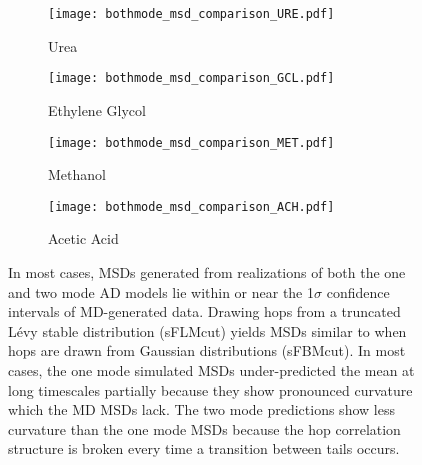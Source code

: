 \documentclass[journal=ancac3,manuscript=article,layout=twocolumn]{achemso}
\begin{document}
  \begin{figure*}
  \centering
  \begin{subfigure}{0.45\textwidth}
  \texttt{[image: bothmode\_msd\_comparison\_URE.pdf]}
  \caption{Urea}\label{fig:bothmode_msd_comparison_URE}
  \end{subfigure}
  \begin{subfigure}{0.45\textwidth}
  \texttt{[image: bothmode\_msd\_comparison\_GCL.pdf]}
  \caption{Ethylene Glycol}\label{fig:bothmode_msd_comparison_GCL}
  \end{subfigure}
  \begin{subfigure}{0.45\textwidth}
  \texttt{[image: bothmode\_msd\_comparison\_MET.pdf]}
  \caption{Methanol}\label{fig:bothmode_msd_comparison_MET}
  \end{subfigure}
  \begin{subfigure}{0.45\textwidth}
  \texttt{[image: bothmode\_msd\_comparison\_ACH.pdf]}
  \caption{Acetic Acid}\label{fig:bothmode_msd_comparison_ACH}
  \end{subfigure}
  \caption{In most cases, MSDs generated from realizations of both the one and
	  two mode AD models lie within or near the 1$\sigma$ confidence
	  intervals of MD-generated data. Drawing hops from a truncated L\'evy
	  stable distribution (sFLMcut) yields MSDs similar to when hops are
	  drawn from Gaussian distributions (sFBMcut). In most cases, the one
	  mode simulated MSDs under-predicted the mean at long timescales
	  partially because they show pronounced curvature which the MD MSDs
	  lack. The two mode predictions show less curvature than the one mode
	  MSDs because the hop correlation structure is broken every time a
	  transition between tails occurs.
  }\label{fig:anomalous_msds}
  \end{figure*}
\end{document}
